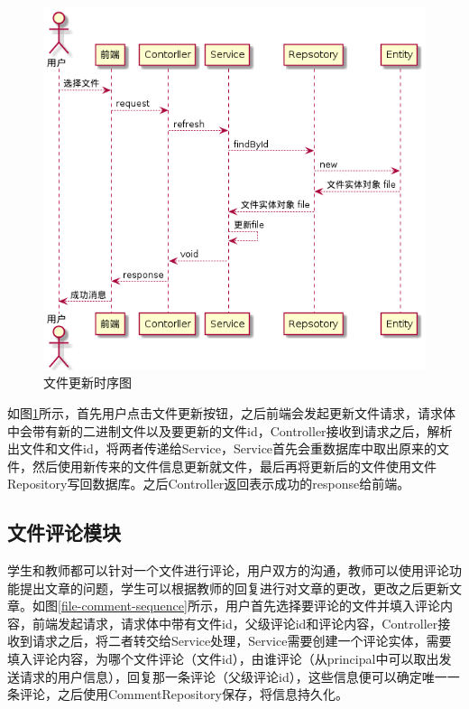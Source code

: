 \begin{figure}[H]
    \centering
    \includegraphics[scale = 0.6]{out/uml/时序图/file-refresh-sequence/file-refresh-sequence.png}
    \caption{\song\wuhao 文件更新时序图}
    \label{file-refresh-sequence}
\end{figure}

如图\ref{file-refresh-sequence}所示，首先用户点击文件更新按钮，之后前端会发起更新文件请求，请求体中会带有新的二进制文件以及要更新的文件id，Controller接收到请求之后，解析出文件和文件id，将两者传递给Service，Service首先会重数据库中取出原来的文件，然后使用新传来的文件信息更新就文件，最后再将更新后的文件使用文件Repository写回数据库。之后Controller返回表示成功的response给前端。

\subsection{文件评论模块}

学生和教师都可以针对一个文件进行评论，用户双方的沟通，教师可以使用评论功能提出文章的问题，学生可以根据教师的回复进行对文章的更改，更改之后更新文章。如图\ref{file-comment-sequence}所示，用户首先选择要评论的文件并填入评论内容，前端发起请求，请求体中带有文件id，父级评论id和评论内容，Controller接收到请求之后，将二者转交给Service处理，Service需要创建一个评论实体，需要填入评论内容，为哪个文件评论（文件id），由谁评论（从principal中可以取出发送请求的用户信息），回复那一条评论（父级评论id），这些信息便可以确定唯一一条评论，之后使用CommentRepository保存，将信息持久化。

